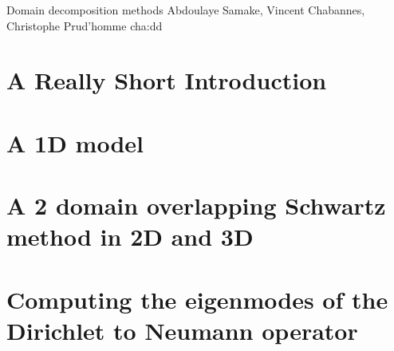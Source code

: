             {Domain decomposition methods}
            {Abdoulaye Samake, Vincent Chabannes, Christophe Prud'homme}
            {cha:dd}

\section{A Really Short Introduction}
\label{sec:really-short-intr}

\section{A 1D model}
\label{sec:1d-mode}

\section{A 2 domain overlapping Schwartz method in 2D and 3D}
\label{sec:2-doma-overl}

\section{Computing the eigenmodes of the Dirichlet to Neumann operator}
\label{sec:comp-eigenm-dirichl}





